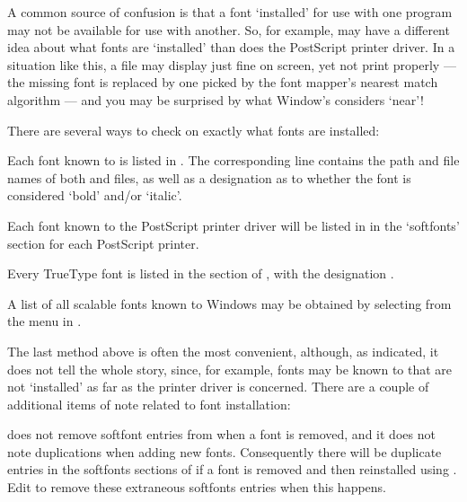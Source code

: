 A common source of confusion is that a font `installed' for
use with one program may not be available for use with another.  So,
for example, {\ATM} may have a different idea about what fonts are
`installed' than does the Post\-Script printer driver.  In a situation
like this, a {\DVI} file may %
display just fine on screen, yet
not print properly --- the missing font is replaced by one
picked by the font mapper's nearest match algorithm
--- and you may be surprised by what Window's considers `near'!


There are several ways to check on exactly what fonts are installed:

\beginbullets

\bpar Each font known to {\ATM} is listed in {\ATMINI}.  
The corresponding line contains the path and file names of both {\PFB}
and {\PFM} files, 
as well as a designation as to whether the font is considered
`bold' and/or `italic'.

\bpar Each font known to the Post\-Script printer driver
will be listed in {\WININI} in the `softfonts'
section for each Post\-Script printer.

\bpar Every True\-Type font is listed in the \type{[Fonts]}
section of {\WININI}, with the designation .

\bpar A list of all scalable fonts known to Windows may be obtained by 
selecting  from the  %
menu in {\DVIWindo}.

\endbullets

\noindent
The last method above is often the most convenient, although, as
indicated, it does not tell the whole story, since, for example, fonts
may be known to {\ATM} that are not `installed' as far as the printer
driver is concerned.
There are a couple of additional items of note related to font installation:

\beginbullets

\bpar {\ATM} does not remove softfont entries from {\WININI} when a
font is removed, and it does not note duplications when adding new fonts.
Consequently there will be duplicate entries in the softfonts
sections of {\WININI} if a font is removed and then reinstalled using {\ATM}.
Edit {\WININI} to remove these extraneous softfonts entries
when this happens.

